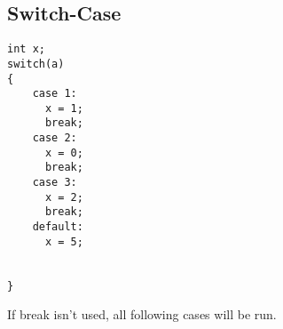 
\subsection{Switch-Case}

\begin{verbatim}
int x;
switch(a)
{
	case 1:
	  x = 1;
	  break;
	case 2:
	  x = 0;
	  break;
	case 3:
	  x = 2;
	  break;
	default:
	  x = 5;
	  

}

\end{verbatim}

If break isn't used, all following cases will be run.

